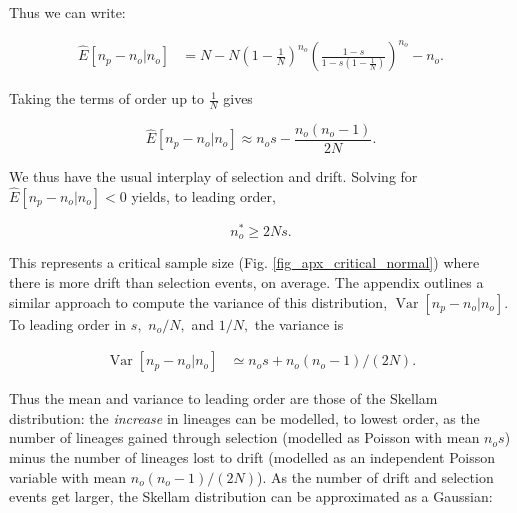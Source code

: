 \documentclass[review]{elsarticle}
\newcommand{\sgcomment}[1]{{\color{red}{SG: #1}}}
\begin{document}
Thus we can write:



\begin{equation}
  \begin{aligned}
    \label{eq_gauss_mean}
    \hat{E}[n_p -n_o | n_o] &= N-N\left( 1 - \frac{1}{N} \right)^{n_o}\left( \frac{1-s}{1-s \left( 1 - \frac{1}{N} \right)}\right)^{n_o}-n_o.
  \end{aligned}
\end{equation}

Taking the terms of order up to $\frac{1}{N}$ gives

\begin{equation}
    \label{eq_lineages_approx}
    \hat{E}[n_p-n_o | n_o] \approx n_o  s - \frac{n_o (n_o-1) }{2N}. 
\end{equation}

We thus have the usual interplay of selection and drift. Solving for $ \hat{E}[n_p -n_o | n_o]<0$
yields, to leading order,

\begin{equation}
  \label{eq_critical_sample}
  n_o^* \ge 2N s.
\end{equation}

This represents a critical sample size (Fig.
\ref{fig_apx_critical_normal}) where there is more drift than selection events, on average. 
The appendix outlines a similar approach to compute the variance of this distribution, $\operatorname{Var}[n_p-n_o | n_o].$ 
To leading order in $s,$ $n_o/N,$ and $1/N,$ the variance is 

\begin{equation}
  \begin{aligned}
    \operatorname{Var}[n_p-n_o | n_o] &\simeq
   n_o  s +   n_o (n_o-1)/(2 N).
    \label{eq_gauss_var}
  \end{aligned}
\end{equation}

Thus the mean and variance to leading order are those of the Skellam distribution: the
\textit{increase} in lineages can be modelled, to lowest order, as the number of lineages gained
through selection (modelled as Poisson with mean  $ n_o s$) minus the number of lineages lost to
drift (modelled as an independent Poisson variable with mean  $ n_o (n_o-1)/(2 N)$).
As the number of drift and selection events get larger, the Skellam distribution can be approximated as a
Gaussian:
\end{document}
